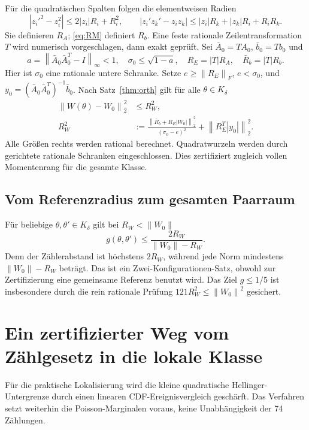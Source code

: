 \documentclass[11pt,a4paper]{article}
\newcommand{\norm}[1]{\left\lVert#1\right\rVert}\newcommand{\abs}[1]{\left|#1\right|}
\begin{document}
Für die quadratischen Spalten folgen die elementweisen Radien
\[
 |z_i'^2-z_i^2|\leq2|z_i|R_i+R_i^2,\qquad
 |z_i'z_k'-z_iz_k|\leq|z_i|R_k+|z_k|R_i+R_iR_k.
\]
Sie definieren $R_A$; \eqref{eq:RM} definiert $R_b$. Eine feste rationale Zeilentransformation $T$ wird numerisch vorgeschlagen, dann exakt geprüft. Sei $\bar A_0=TA_0$, $\bar b_0=Tb_0$ und
\[
 a=\norm{\bar A_0\bar A_0^T-I}_\infty<1,
 \quad\sigma_0\leq\sqrt{1-a},\quad
 R_E=|T|R_A,\quad \bar R_b=|T|R_b.
\]
Hier ist $\sigma_0$ eine rationale untere Schranke. Setze $e\geq\norm{R_E}_F$, $e<\sigma_0$, und $y_0=(\bar A_0\bar A_0^T)^{-1}\bar b_0$. Nach Satz~\ref{thm:orth} gilt für alle $\theta\in K_\delta$
\begin{equation}\label{eq:R2}
 \begin{aligned}
 \norm{W(\theta)-W_0}_2^2&\leq R_W^2,\\
 R_W^2&:=
 \frac{\norm{\bar R_b+R_E|W_0|}_2^2}{(\sigma_0-e)^2}
 +\norm{R_E^T|y_0|}_2^2.
 \end{aligned}
\end{equation}
Alle Größen rechts werden rational berechnet. Quadratwurzeln werden durch gerichtete rationale Schranken eingeschlossen. Dies zertifiziert zugleich vollen Momentenrang für die gesamte Klasse.

\subsection{Vom Referenzradius zum gesamten Paarraum}
Für beliebige $\theta,\theta'\in K_\delta$ gilt bei $R_W<\norm{W_0}$
\begin{equation}\label{eq:pair}
 g(\theta,\theta')\leq\frac{2R_W}{\norm{W_0}-R_W}.
\end{equation}
Denn der Zählerabstand ist höchstens $2R_W$, während jede Norm mindestens $\norm{W_0}-R_W$ beträgt. Das ist ein Zwei-Konfigurationen-Satz, obwohl zur Zertifizierung eine gemeinsame Referenz benutzt wird. Das Ziel $g\leq1/5$ ist insbesondere durch die rein rationale Prüfung $121R_W^2\leq\norm{W_0}^2$ gesichert.

\section{Ein zertifizierter Weg vom Zählgesetz in die lokale Klasse}
Für die praktische Lokalisierung wird die kleine quadratische Hellinger-Untergrenze durch einen linearen CDF-Ereignisvergleich geschärft. Das Verfahren setzt weiterhin die Poisson-Marginalen voraus, keine Unabhängigkeit der 74 Zählungen.
\end{document}
